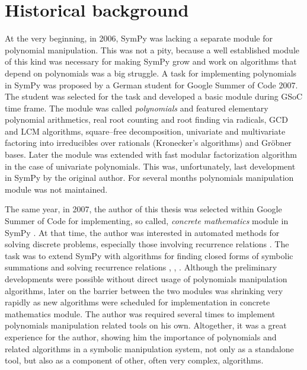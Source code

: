 \section{Historical background}

At the very beginning, in 2006, SymPy was lacking a separate module for polynomial manipulation.
This was not a pity, because a well established module of this kind was necessary for making SymPy
grow and work on algorithms that depend on polynomials was a big struggle. A task for implementing
polynomials in SymPy was proposed by a German student for Google Summer of Code 2007. The student
was selected for the task and developed a basic module during GSoC time frame. The module was called
\emph{polynomials} and featured elementary polynomial arithmetics, real root counting and root finding via
radicals, GCD and LCM algorithms, square--free decomposition, univariate and multivariate factoring
into irreducibles over rationals (Kronecker's algorithms) and Gröbner bases. Later the module was
extended with fast modular factorization algorithm in the case of univariate polynomials. This was,
unfortunately, last development in SymPy by the original author. For several months polynomials
manipulation module was not maintained.

The same year, in 2007, the author of this thesis was selected within Google Summer of Code for
implementing, so called, \emph{concrete mathematics} module in SymPy \cite{Graham1994concrete}. At that
time, the author was interested in automated methods for solving discrete problems, especially
those involving recurrence relations \cite{Nemes1997monthly}. The task was to extend SymPy with
algorithms for finding closed forms of symbolic summations and solving recurrence relations
\cite{Petkovsek1997AeqB}, \cite{Abramov1995rational}, \cite{Petkovsek1992hyper}. Although the preliminary
developments were possible without direct usage of polynomials manipulation algorithms, later
on the barrier between the two modules was shrinking very rapidly as new algorithms were scheduled
for implementation in concrete mathematics module. The author was required several times to implement
polynomials manipulation related tools on his own. Altogether, it was a great experience for the
author, showing him the importance of polynomials and related algorithms in a symbolic manipulation
system, not only as a standalone tool, but also as a component of other, often very complex, algorithms.

